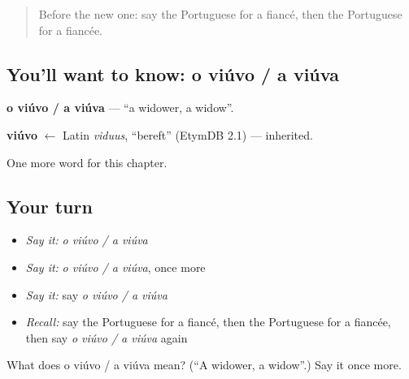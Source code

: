 \label{lesson:PT-C221-viuvo-a-viuva}



\begin{quote}
Before the new one: say the Portuguese for a fiancé, then the Portuguese for a fiancée.
\end{quote}

\subsection*{You'll want to know: o viúvo / a viúva}
\textbf{o viúvo / a viúva} — \textquotedblleft{}a widower, a widow\textquotedblright{}.

\begin{cousinweb}
\textbf{viúvo} $\leftarrow$ Latin \emph{viduus}, \textquotedblleft{}bereft\textquotedblright{} (EtymDB 2.1) — inherited.
\end{cousinweb}

\begin{grammarlens}[title={What you've built}]
One more word for this chapter.
\end{grammarlens}

\subsection*{Your turn}
\begin{itemize}
\raggedright
  \item \emph{Say it:} \emph{o viúvo / a viúva}
  \item \emph{Say it:} \emph{o viúvo / a viúva}, once more
  \item \emph{Say it:} say \emph{o viúvo / a viúva}
  \item \emph{Recall:} say the Portuguese for a fiancé, then the Portuguese for a fiancée, then say \emph{o viúvo / a viúva} again
\end{itemize}

\begin{tcolorbox}[breakable,colback=teal!4,colframe=teal!35!black,title={Before you move on}]
What does o viúvo / a viúva mean? (\textquotedblleft{}A widower, a widow\textquotedblright{}.) Say it once more.
\end{tcolorbox}
